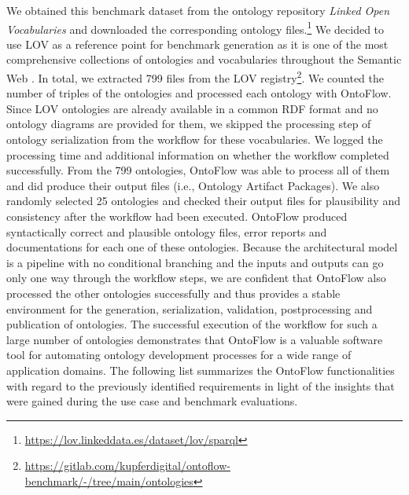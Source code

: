 \documentclass[runningheads]{llncs}
\begin{document}
We obtained this benchmark dataset from the ontology repository \textit{Linked Open Vocabularies} and downloaded the corresponding ontology files.\footnote{\url{https://lov.linkeddata.es/dataset/lov/sparql}} We decided to use LOV as a reference point for benchmark generation as it is one of the most comprehensive collections of ontologies and vocabularies throughout the Semantic Web \cite{lov}. In total, we extracted 799 files from the LOV registry\footnote{\url{https://gitlab.com/kupferdigital/ontoflow-benchmark/-/tree/main/ontologies}}. We counted the number of triples of the ontologies and processed each ontology with OntoFlow. Since LOV ontologies are already available in a common RDF format and no ontology diagrams are provided for them, we skipped the processing step of ontology serialization from the workflow for these vocabularies. We logged the processing time and additional information on whether the workflow completed successfully. From the 799 ontologies, OntoFlow was able to process all of them and did produce their output files (i.e., Ontology Artifact Packages). We also randomly selected 25 ontologies and checked their output files for plausibility and consistency after the workflow had been executed. OntoFlow produced syntactically correct and plausible ontology files, error reports and documentations for each one of these ontologies. Because the architectural model is a pipeline with no conditional branching and the inputs and outputs can go only one way through the workflow steps, we are confident that OntoFlow also processed the other ontologies successfully and thus provides a stable environment for the generation, serialization, validation, postprocessing and publication of ontologies. The successful execution of the workflow for such a large number of ontologies demonstrates that OntoFlow is a valuable software tool for automating ontology development processes for a wide range of application domains. The following list summarizes the OntoFlow functionalities with regard to the previously identified requirements in light of the insights that were gained during the use case and benchmark evaluations.  
\end{document}
